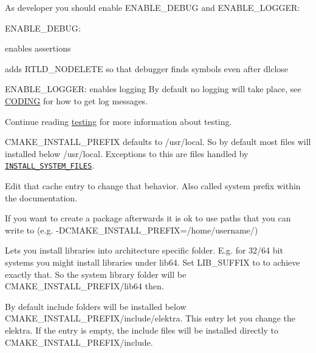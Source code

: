 As developer you should enable {\ttfamily E\+N\+A\+B\+L\+E\+\_\+\+D\+E\+B\+UG} and {\ttfamily E\+N\+A\+B\+L\+E\+\_\+\+L\+O\+G\+G\+ER}\+:


\begin{DoxyItemize}
\item {\ttfamily E\+N\+A\+B\+L\+E\+\_\+\+D\+E\+B\+UG}\+:
\begin{DoxyItemize}
\item enables assertions
\item adds R\+T\+L\+D\+\_\+\+N\+O\+D\+E\+L\+E\+TE so that debugger finds symbols even after dlclose
\end{DoxyItemize}
\item {\ttfamily E\+N\+A\+B\+L\+E\+\_\+\+L\+O\+G\+G\+ER}\+: enables logging By default no logging will take place, see \hyperlink{doc_CODING_md}{C\+O\+D\+I\+NG} for how to get log messages.
\end{DoxyItemize}

Continue reading \hyperlink{doc_TESTING_md}{testing} for more information about testing.

{\ttfamily C\+M\+A\+K\+E\+\_\+\+I\+N\+S\+T\+A\+L\+L\+\_\+\+P\+R\+E\+F\+IX} defaults to {\ttfamily /usr/local}. So by default most files will installed below {\ttfamily /usr/local}. Exceptions to this are files handled by \href{#install_system_files}{\tt I\+N\+S\+T\+A\+L\+L\+\_\+\+S\+Y\+S\+T\+E\+M\+\_\+\+F\+I\+L\+ES}.

Edit that cache entry to change that behavior. Also called system prefix within the documentation.

If you want to create a package afterwards it is ok to use paths that you can write to (e.\+g. {\ttfamily -\/\+D\+C\+M\+A\+K\+E\+\_\+\+I\+N\+S\+T\+A\+L\+L\+\_\+\+P\+R\+E\+F\+IX=/home/username/})

Lets you install libraries into architecture specific folder. E.\+g. for 32/64 bit systems you might install libraries under {\ttfamily lib64}. Set {\ttfamily L\+I\+B\+\_\+\+S\+U\+F\+F\+IX} to {} to achieve exactly that. So the system library folder will be {\ttfamily C\+M\+A\+K\+E\+\_\+\+I\+N\+S\+T\+A\+L\+L\+\_\+\+P\+R\+E\+F\+I\+X/lib64} then.

By default include folders will be installed below {\ttfamily C\+M\+A\+K\+E\+\_\+\+I\+N\+S\+T\+A\+L\+L\+\_\+\+P\+R\+E\+F\+I\+X/include/elektra}. This entry let you change the elektra. If the entry is empty, the include files will be installed directly to {\ttfamily C\+M\+A\+K\+E\+\_\+\+I\+N\+S\+T\+A\+L\+L\+\_\+\+P\+R\+E\+F\+I\+X/include}.

